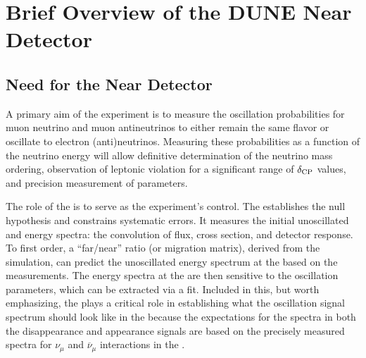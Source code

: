 \label{ch:appx-nd}

\section{Brief Overview of the DUNE Near Detector}
\label{sec:appx-nd-overview}


\subsection{Need for the Near Detector}
\label{sec:appx-nd:BriefOverview-need}

A primary aim of the  experiment is to measure the oscillation probabilities for muon neutrino and muon antineutrinos to either remain the same flavor or oscillate to electron (anti)neutrinos. 
Measuring these probabilities as a function of the neutrino energy will allow definitive determination of the neutrino mass ordering, observation of leptonic  violation for a significant range of $\delta_{\rm{CP}}$ values, and precision measurement of  parameters.

The role of the  is to serve as the experiment's control. The  establishes the null hypothesis and constrains systematic errors. It measures the initial unoscillated \numu and \nue energy spectra: the convolution of flux, cross section, and detector response. To first order, a ``far/near'' ratio (or migration matrix), derived from the simulation, can predict the unoscillated energy spectrum at the  based on the  measurements.  The energy spectra at the  are then sensitive to the oscillation parameters, which can be extracted via a fit.  Included in this, but worth emphasizing, the  plays a critical role in establishing what the oscillation signal spectrum should look like in the  because the expectations for the spectra in both the disappearance and appearance signals are based on the precisely measured spectra for $\nu_{\mu}$ and $\overline{\nu}_{\mu}$ interactions in the .


